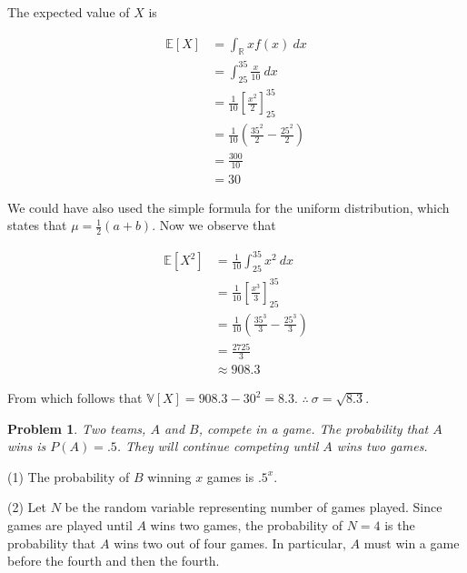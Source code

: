 \documentclass[a4paper, 12pt]{article}
\newtheorem{problem}{Problem}
\newtheorem{problem}{Problem}
\begin{document}
The expected value of $X$ is 

\begin{align*}
    \mathbb{E}\left[ X \right] &= \int_{\mathbb{R}} x f(x) ~ dx \\ 
                               &= \int_{25}^{35} \frac{x}{10} ~ dx \\ 
                               &= \frac{1}{10} \left[ \frac{x^2}{2} \right]_{25}^{35}  \\ 
                               &=\frac{1}{10}\left( \frac{35^2}{2} - \frac{25^2}{2} \right)  \\ 
                               &= \frac{300}{10} \\ 
                               &= 30
\end{align*}

We could have also used the simple formula for the uniform distribution, which
states that $\mu = \frac{1}{2}(a+b)$. Now we observe that 

\begin{align*}
    \mathbb{E}\left[ X^2 \right] &= \frac{1}{10} \int_{25}^{35}x^2 ~ dx \\ 
                               &= \frac{1}{10} \left[ \frac{x^3}{3} \right]_{25}^{35}  \\ 
                               &=\frac{1}{10}\left( \frac{35^3}{3} - \frac{25^3}{3} \right)  \\ 
                               &= \frac{2725}{3} \\ 
                               &\approx 908.3
\end{align*}

From which follows that $\mathbb{V}\left[ X \right] = 908.3 - 30^2 = 8.3$. $\therefore ~ \sigma = \sqrt{8.3} $.


\pagebreak 

\begin{problem}
    Two teams, $A$ and $ B$, compete in a game. The probability that 
    $A$ wins is $P(A) = .5$. They will continue competing until 
    $A$ wins two games.
\end{problem}

(1) The probability of $B$ winning $x$ games is $.5^x$. 

(2) Let $N$ be the random variable representing number of games played. Since
games are played until $A$ wins two games, the probability of $N = 4$ is the
probability that $A$ wins two out of four games. In particular, $A$ must win a
game before the fourth and then the fourth. 
\end{document}
